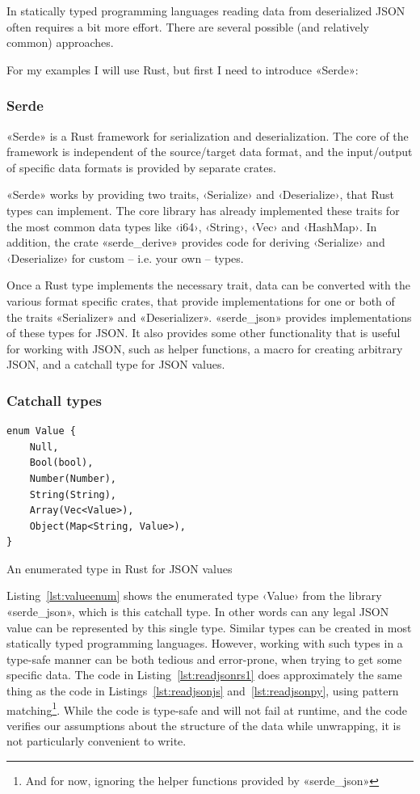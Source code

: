 In statically typed programming languages reading data from deserialized JSON often requires a bit more effort. There are several possible (and relatively common) approaches.

For my examples I will use Rust, but first I need to introduce «Serde»:

\subsubsection{Serde}
\label{sec:serde}

«Serde» \cite{serde} is a Rust framework for serialization and deserialization. The core of the framework is independent of the source/target data format, and the input/output of specific data formats is provided by separate crates.

«Serde» works by providing two traits, ‹Serialize› and ‹Deserialize›, that Rust types can implement. The core library has already implemented these traits for the most common data types like ‹i64›, ‹String›, ‹Vec› and ‹HashMap›. In addition, the crate «serde_derive» provides code for deriving ‹Serialize› and ‹Deserialize› for custom -- i.e. your own -- types.

Once a Rust type implements the necessary trait, data can be converted with the various format specific crates, that provide implementations for one or both of the traits «Serializer» and «Deserializer». «serde_json» \cite{serdejson} provides implementations of these types for JSON. It also provides some other functionality that is useful for working with JSON, such as helper functions, a macro for creating arbitrary JSON, and a catchall type for JSON values.

\subsubsection{Catchall types}

\begin{listing}[ht!]
\begin{verbatim}
enum Value {
    Null,
    Bool(bool),
    Number(Number),
    String(String),
    Array(Vec<Value>),
    Object(Map<String, Value>),
}
\end{verbatim}
\caption{An enumerated type in Rust for JSON values}
\label{lst:valueenum}
\end{listing}

Listing~\ref{lst:valueenum} shows the enumerated type ‹Value› from the library «serde_json», which is this catchall type. In other words can any legal JSON value can be represented by this single type. Similar types can be created in most statically typed programming languages. However, working with such types in a type-safe manner can be both tedious and error-prone, when trying to get some specific data. The code in Listing~\ref{lst:readjsonrs1} does approximately the same thing as the code in Listings~\ref{lst:readjsonjs} and~\ref{lst:readjsonpy}, using pattern matching\footnote{And for now, ignoring the helper functions provided by «serde_json»}. While the code is type-safe and will not fail at runtime, and the code verifies our assumptions about the structure of the data while unwrapping, it is not particularly convenient to write.

